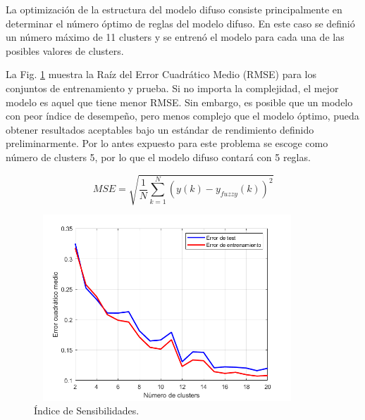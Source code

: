 \documentclass[12pt]{article}
\begin{document}
La optimización de la estructura del modelo difuso consiste principalmente en determinar el número óptimo de reglas del modelo difuso. En este caso se definió un número máximo de 11 clusters y se entrenó el modelo para cada una de las posibles valores de clusters.

La Fig. \ref{f_P1reglas11} muestra la Raíz del Error Cuadrático Medio (RMSE) para los conjuntos de entrenamiento y prueba.  Si no importa la complejidad, el mejor modelo es aquel que
tiene menor RMSE. Sin embargo, es posible que un modelo con peor índice de
desempeño, pero menos complejo que el modelo óptimo, pueda obtener resultados
aceptables bajo un estándar de rendimiento definido preliminarmente. Por lo antes expuesto para este problema se escoge como número de clusters 5, por lo que el modelo difuso contará con 5 reglas.

\begin{equation}
MSE=\sqrt{\frac{1}{N}\sum_{k=1}^{N}(y(k)-y_{fuzzy}(k))^2}
\label{e_RMSE}
\end{equation}



\begin{figure}
\centering
\includegraphics[width=10cm,height=7cm]{imag/P1reglas12}
\caption{Índice de Sensibilidades.}
\label{f_P1reglas11}
\end{figure}
\end{document}

